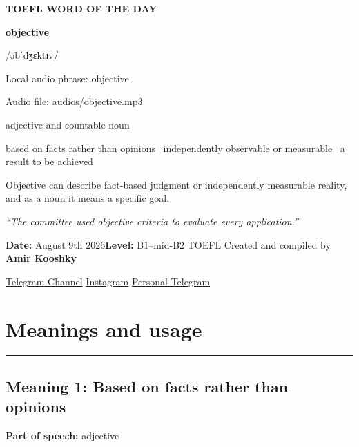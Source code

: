 \documentclass[11pt]{article}
\newcommand{\sectionrule}{\par\vspace{-0.5em}\noindent\textcolor{Accent}{\rule{\linewidth}{0.6pt}}\par}
\begin{document}
\begin{center}
{\sffamily\bfseries\color{Accent} TOEFL WORD OF THE DAY\par}
\vspace{8mm}
{\fontsize{42}{48}\selectfont\bfseries objective\par}
\vspace{2mm}
{\Large\sffamily\color{Accent} /əbˈdʒɛktɪv/\par}
\vspace{2mm}
{\small\sffamily Local audio phrase: objective\par}
{\small\sffamily Audio file: audios/objective.mp3\par}
\vspace{2mm}
{\large\sffamily\color{Muted} adjective and countable noun\par}
\vspace{5mm}
{\sffamily based on facts rather than opinions \textbullet\ independently observable or measurable \textbullet\ a result to be achieved\par}
\vspace{6mm}
{\large Objective can describe fact-based judgment or independently measurable reality, and as a noun it means a specific goal.\par}
\vspace{6mm}
\begin{minipage}{0.84\textwidth}
\itshape “The committee used objective criteria to evaluate every application.”
\end{minipage}\par
\vspace{10mm}
\textbf{Date:} August 9th 2026\quad\textbullet\quad \textbf{Level:} B1--mid-B2 TOEFL
\vfill
Created and compiled by \textbf{Amir Kooshky}\par
\vspace{2mm}
\href{https://t.me/KooshkyTOEFL}{Telegram Channel}\quad\textbullet\quad
\href{https://www.instagram.com/kooshkytoefl}{Instagram}\quad\textbullet\quad
\href{https://t.me/KooshkyTOEFL\_pv}{Personal Telegram}
\end{center}
\newpage
\tableofcontents
\newpage

\section{Meanings and usage}
\sectionrule
\subsection{Meaning 1: Based on facts rather than opinions}
\textbf{Part of speech:} adjective
\end{document}
